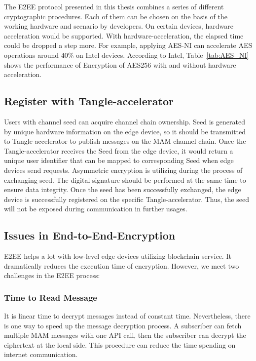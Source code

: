 \begin{spacing}{2.0}
The E2EE protocol presented in this thesis combines a series of different cryptographic procedures. Each of them can be chosen on the basis of the working hardware and scenario by developers. On certain devices, hardware acceleration would be supported. With hardware-acceleration, the elapsed time could be dropped a step more. For example, applying AES-NI can accelerate AES operations around 40\% on Intel devices.\cite{AES-NI-Acceleration} According to Intel, Table~\ref{tab:AES_NI} shows the performance of Encryption of AES256 with and without hardware acceleration.

\subsection{Register with Tangle-accelerator}
Users with channel seed can acquire channel chain ownership. Seed is generated by unique hardware information on the edge device, so it should be transmitted to Tangle-accelerator to publish messages on the MAM channel chain. Once the Tangle-accelerator receives the Seed from the edge device, it would return a unique user identifier that can be mapped to corresponding Seed when edge devices send requests. Asymmetric encryption is utilizing during the process of exchanging seed. The digital signature should be performed at the same time to ensure data integrity. Once the seed has been successfully exchanged, the edge device is successfully registered on the specific Tangle-accelerator. Thus, the seed will not be exposed during communication in further usages.

\subsection{Issues in End-to-End-Encryption}
E2EE helps a lot with low-level edge devices utilizing blockchain service. It dramatically reduces the execution time of encryption. However, we meet two challenges in the E2EE process:

\subsubsection{Time to Read Message}
It is linear time to decrypt messages instead of constant time. Nevertheless, there is one way to speed up the message decryption process. A subscriber can fetch multiple MAM messages with one API call, then the subscriber can decrypt the ciphertext at the local side. This procedure can reduce the time spending on internet communication.


\end{spacing}
